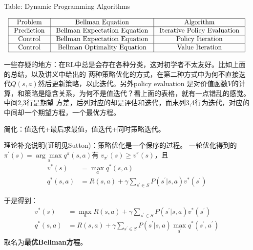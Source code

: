 \documentclass[UTF8]{ctexart}
\begin{document}
\begin{center}
    Table: Dynamic Programming Algorithms
\end{center}
$$\begin{array}{|c|c|c|}
    \hline \text { Problem } & \text { Bellman Equation } & \text { Algorithm } \\
    \hline \text { Prediction } & \text { Bellman Expectation Equation } & \text { Iterative Policy Evaluation } \\
    \hline \text { Control } & \text { Bellman Expectation Equation } & \text { Policy Iteration } \\
    \hline \text { Control } & \text { Bellman Optimality Equation } & \text { Value Iteration } \\
    \hline
    \end{array}$$

一些存疑的地方：在RL中总是会存在各种分类，这对初学者不太友好。比如上面的总结，以及讲义中给出的
两种策略优化的方式，在第二种方式中为何不直接迭代$Q(s,a)$然后更新策略，以此迭代。另外policy evaluation
是对价值函数$V$的计算，和策略是隐含关系，为何不是值迭代？看上面的表格，就有一点错乱的感觉。中间2,3行是期望
方差，后列对应的却是评估和迭代，而末列3,4行为迭代，对应的中间却一个期望方程，一个最优方程。

简化：值迭代+最后求最值，值迭代+同时策略迭代。

理论补充说明(证明见Sutton)：策略优化是一个保序的过程。
一轮优化得到的$\pi^{\prime}(s)=\underset{a}{\arg \max } q^{\pi}(s, a)$有
$v_{\pi^{\prime}}(s) \geq v^{\pi}(s)$，且
\begin{equation}
    \begin{aligned} v^{*}(s) &=\max _{a} q^{*}(s, a) \\ q^{*}(s, a)
        &=R(s, a)+\gamma \sum_{s^{\prime} \in S} P\left(s^{\prime} | s,
        a\right) v^{*}\left(s^{\prime}\right) \end{aligned}
\end{equation}

 于是得到：
 \begin{equation}
    \begin{aligned} v^{*}(s) &=\max _{a} R(s, a)  + \gamma \sum_{s^{\prime} \in S }P\left(s^{\prime} | s,
        a\right) v^{*}\left(s^{\prime}\right)\\ 
        q^{*}(s, a) &=R(s, a)+\gamma \sum_{s^{\prime} \in S} P\left(s^{\prime} | s,
        a\right) \max_{a^{\prime}} q^{*}(s^{\prime}, a^{\prime}) \\
    \end{aligned}
 \end{equation}
 取名为\textbf{最优Bellman方程}。
\end{document}

